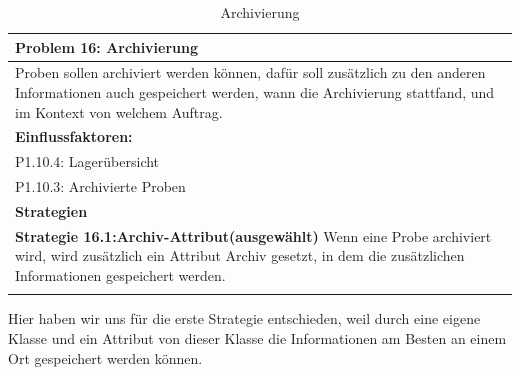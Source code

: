 \documentclass[enabledeprecatedfontcommands,fontsize=12pt,paper=a4,twoside]{scrartcl}
\begin{document}
\begin{table}[H]
    \centering
    \begin{tabular}{|p{15cm}|}
    \hline
          \textbf{Problem 16:} Archivierung
          \\ \hline
	Proben sollen archiviert werden können, dafür soll zusätzlich zu den anderen Informationen auch gespeichert werden, wann die Archivierung stattfand, und im Kontext von welchem Auftrag.
          \\ \hline
          \textbf{Einflussfaktoren: } \\
          P1.10.4: Lagerübersicht \\ 
	P1.10.3: Archivierte Proben \\
          \hline
          \textbf{Strategien} \\ \hline
          {}          
           \label{strategie:16.1}   
            \textbf{Strategie 16.1:Archiv-Attribut(ausgewählt)} Wenn eine Probe archiviert wird, wird zusätzlich ein Attribut Archiv gesetzt, in dem die zusätzlichen Informationen gespeichert werden. \\
          \\ \hline
    \end{tabular}
    \caption{Archivierung}
    \label{tab:ProblemKarte16}
\end{table}
Hier haben wir uns für die erste Strategie entschieden, weil durch eine eigene Klasse und ein Attribut von dieser Klasse die Informationen am Besten an einem Ort gespeichert werden können. \\
\end{document}
